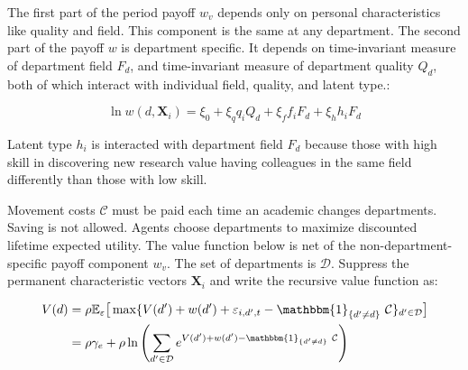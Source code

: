 The first part of the period payoff $w_v$ depends only
on personal characteristics like quality and field. This component is the 
same at any department.  The second part of the payoff
$w$ is department specific. It depends on time-invariant measure of department
field $F_d$, and time-invariant measure of department quality $Q_d$, both of which interact with
individual field, quality, and latent type.\footnotemark{}:

\begin{equation}
    \ln w(d, \mathbf{X}_i) = \xi_0  + \xi_q q_i Q_d + \xi_f f_i F_d + \xi_h h_i F_d
    \label{eq:horz_wage}
\end{equation} 

Latent type $h_i$ is interacted with department field $F_d$ because those with high
skill in discovering new research value having colleagues
in the same field differently than those with low skill.

Movement costs $\mathcal{C}$ must be paid each time an academic changes departments.\footnotemark{} Saving is not allowed. Agents choose departments to maximize discounted lifetime expected utility.
The value function below is net of the non-department-specific payoff component $w_v$.\footnotemark{}
The set of departments is $\mathcal{D}$.
Suppress the permanent characteristic vectors $\mathbf{X}_i$ and write the
recursive value function as:

\begin{align}
    V(d) &= \rho \mathbb{E}_\varepsilon \big[\max\{V(d') + w(d') + \varepsilon_{i,d',t} - \mathbbm{1}_{\{d'\neq d\}} \ \mathcal{C}\}_{d'\in \mathcal{D}}\big] \nonumber \\
    &= \rho \gamma_e + \rho \ln\left( \sum_{d' \in \mathcal{D}} e^{V(d') + w(d') - \mathbbm{1}_{\{d'\neq d\}} \ \mathcal{C}} \right)
    \label{eq:val_fun}
\end{align}


